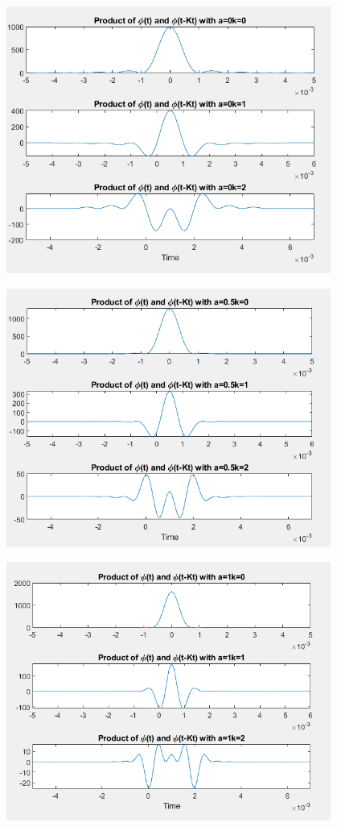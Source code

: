 \begin{center}
    \centering
    \includegraphics[width=0.8\textwidth]{BETA/Images/B2.1.png} %
\end{center}


\begin{center}
    \centering
    \includegraphics[width=0.8\textwidth]{BETA/Images/B2.2.png} %
\end{center}


\begin{center}
    \centering
    \includegraphics[width=0.8\textwidth]{BETA/Images/B2.3.png} %
\end{center}





